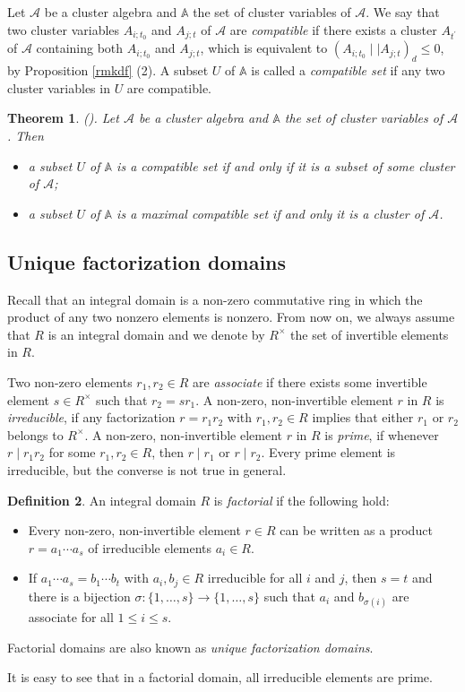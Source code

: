 \documentclass{amsart}
\newtheorem{theorem}{Theorem}[section]
\theoremstyle{definition}
\newtheorem{definition}[theorem]{Definition}
\theoremstyle{remark}
\numberwithin{equation}{section}
\begin{document}
Let $\mathcal A$ be a cluster algebra and $\mathbb A$  the set of cluster variables of $\mathcal A$.
We say that two cluster variables $A_{i;t_0}$ and $A_{j;t}$ of $\mathcal A$ are {\em compatible}  if there exists a cluster $A_{t^\prime}$ of $\mathcal A$ containing both $A_{i;t_0}$ and $A_{j;t}$, which is equivalent to $(A_{i;t_0}\mid\mid  A_{j;t})_d\leq 0$, by Proposition \ref{rmkdf} (2). A subset $U$ of $\mathbb A$  is called a  {\em compatible set} if any two cluster variables in $U$ are compatible.
\begin{theorem}{\rm (}\cite[Theorem 13]{CL1}{\rm ).}  \label{thmcomp}
Let $\mathcal A$ be a cluster algebra and $\mathbb A$  the set of cluster variables of  $\mathcal A$. Then
\begin{itemize}
\item[(i)] a subset $U$ of $\mathbb A$ is a compatible set if and only if it is a subset of some  cluster of $\mathcal A$;
\item[(ii)] a subset $U$ of $\mathbb A$ is a maximal compatible set if and only it is a cluster of $\mathcal A$.
\end{itemize}
\end{theorem}


\subsection{Unique factorization domains}
 Recall that an integral domain is a non-zero commutative
ring in which the product of any two nonzero elements is nonzero. From now on, we always assume that $R$ is an integral domain and we denote by $R^\times$  the set of invertible elements in $R$.


Two non-zero elements $r_1,r_2\in R$
are {\em associate} if there exists some invertible element $s\in R^\times$ such that $r_2=sr_1$. A non-zero, non-invertible element $r$ in  $R$ is {\em irreducible}, if
any factorization $r=r_1r_2$ with $r_1,r_2\in R$ implies that either $r_1$ or $r_2$ belongs to $R^\times$. A non-zero, non-invertible element $r$ in $R$ is {\em prime},  if
whenever $r\mid r_1r_2$ for some  $r_1,r_2\in R$, then $r\mid r_1$ or $r\mid r_2$. Every prime element is
irreducible, but the converse is not true in general.

\begin{definition}
 An integral domain $R$
is  {\em factorial}  if the following hold:
\begin{itemize}
\item[(i)] Every non-zero, non-invertible element $r\in R$ can be written as a product
$r=a_1\cdots a_s$ of irreducible elements $a_i\in R$.
\item[(ii)] If $a_1\cdots a_s=b_1\cdots b_t$ with $a_i,b_j\in R$ irreducible for all $i$ and $j$, then
$s=t$ and there is a bijection $\sigma:\{1,\ldots,s\}\rightarrow \{1,\ldots,s\}$ such that $a_i$
and $b_{\sigma(i)}$ are associate for all $1\leq i\leq s$.
\end{itemize}

Factorial domains are also known as {\em unique factorization domains}.
\end{definition}
It is easy to see that in a factorial domain, all irreducible elements are prime.
\end{document}
